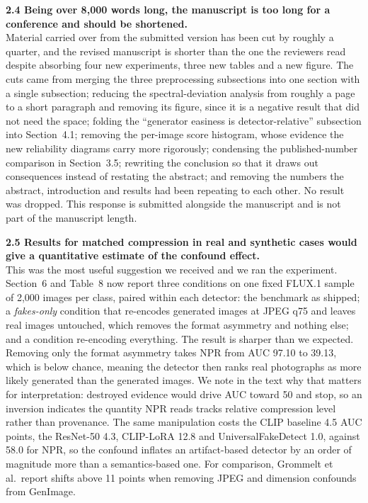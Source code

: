 \documentclass[11pt]{article}
\begin{document}
\noindent\textbf{2.4 Being over 8,000 words long, the manuscript is too
long for a conference and should be shortened.}\\[1pt]
Material carried over from the submitted version has been cut by roughly a
quarter, and the revised manuscript is shorter than the one the reviewers
read despite absorbing four new experiments, three new tables and a new
figure. The cuts came from merging the three preprocessing subsections
into one section with a single subsection; reducing the spectral-deviation
analysis from roughly a page to a short paragraph and removing its figure,
since it is a negative result that did not need the space; folding the
``generator easiness is detector-relative'' subsection into Section~4.1;
removing the per-image score histogram, whose evidence the new reliability
diagrams carry more rigorously; condensing the published-number comparison
in Section~3.5; rewriting the conclusion so that it draws out consequences
instead of restating the abstract; and removing the numbers the abstract,
introduction and results had been repeating to each other. No result was
dropped. This response is submitted
alongside the manuscript and is not part of the manuscript length.

\noindent\textbf{2.5 Results for matched compression in real and synthetic
cases would give a quantitative estimate of the confound effect.}\\[1pt]
This was the most useful suggestion we received and we ran the experiment.
Section~6 and Table~8 now report
three conditions on one fixed FLUX.1 sample of 2{,}000 images per class,
paired within each detector: the benchmark as shipped; a
\emph{fakes-only} condition that re-encodes generated images at JPEG q75
and leaves real images untouched, which removes the format asymmetry and
nothing else; and a condition re-encoding everything. The result is
sharper than we expected. Removing only the format asymmetry takes NPR
from AUC 97.10 to 39.13, which is below chance, meaning the detector then
ranks real photographs as more likely generated than the generated images.
We note in the text why that matters for interpretation: destroyed
evidence would drive AUC toward 50 and stop, so an inversion indicates the
quantity NPR reads tracks relative compression level rather than
provenance. The same manipulation costs the CLIP baseline 4.5 AUC points,
the ResNet-50 4.3, CLIP-LoRA 12.8 and UniversalFakeDetect 1.0, against
58.0 for NPR, so the confound inflates an artifact-based detector by an
order of magnitude more than a semantics-based one. For comparison,
Grommelt et al.\ report shifts above 11 points when removing JPEG and
dimension confounds from GenImage.
\end{document}
